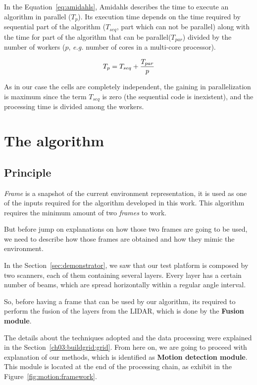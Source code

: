 In the Equation~\ref{eq:amidahls}, Amidahls describes the time to execute an algorithm in parallel ($T_p$). Its execution time depends on the time required by sequential part of the algorithm ($T_{seq}$, part which can not be parallel) along with the time for part of the algorithm that can be parallel($T_{par}$) divided by the number of workers ($p$, \textit{e.g.} number of cores in a multi-core processor).

\begin{equation}
\label{eq:amidahls}
T_p=T_{seq}+{T_{par} \over p}
\end{equation}

As in our case the cells are completely independent, the gaining in parallelization is maximum since the term $T_{seq}$ is zero (the sequential code is inexistent), and the processing time is divided among the workers.

\section{The algorithm}

\subsection{Principle} 

\textit{Frame} is a snapshot of the current environment representation, it is used as one of the inputs required for the algorithm developed in this work. This algorithm requires the minimum amount of two \textit{frames} to work. 

But before jump on explanations on how those two frames are going to be used, we need to describe how those frames are obtained and how they mimic the environment.

In the Section~\ref{sec:demonstrator}, we saw that our test platform is composed by two scanners, each of them containing several layers. Every layer has a certain number of beams, which are spread horizontally within a regular angle interval. 

So, before having a frame that can be used by our algorithm, its required to perform the fusion of the layers from the LIDAR, which is done by the \textbf{Fusion module}. 

The details about the techniques adopted and the data processing were explained in the Section~\ref{ch03:buildgrid:grid}. From here on, we are going to proceed with explanation of our methods, which is identified as \textbf{Motion detection module}. This module is located at the end of the processing chain, as exhibit in the Figure~\ref{fig:motion:framework}. 

